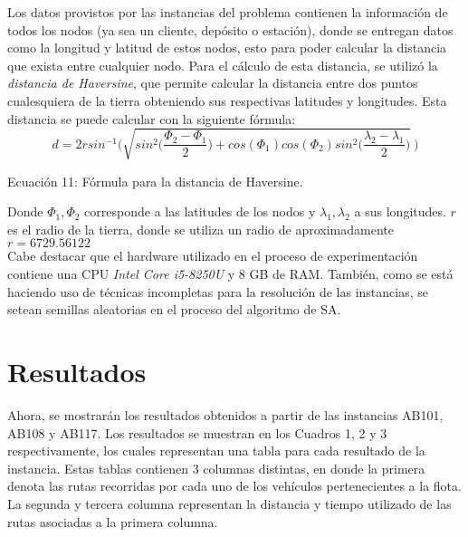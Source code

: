 \documentclass[letter, 10pt]{article}
\begin{document}
Los datos provistos por las instancias del problema contienen la información de todos los nodos (ya sea un cliente, depósito o estación), donde se entregan datos como la longitud y latitud de estos nodos, esto para poder calcular la distancia que exista entre cualquier nodo. Para el cálculo de esta distancia, se utilizó la \emph{distancia de Haversine}, que permite calcular la distancia entre dos puntos cualesquiera de la tierra obteniendo sus respectivas latitudes y longitudes. Esta distancia se puede calcular con la siguiente fórmula:
\\
\begin{equation}
    d = 2r sin^{-1}\bigg(\sqrt{sin^2\Big(\frac{\Phi_2-\Phi_1}{2}\Big)+cos(\Phi_1)cos(\Phi_2)sin^2\Big(\frac{\lambda_2-\lambda_1}{2}\Big)}\ \bigg)
\end{equation}

\begin{center}
    Ecuación 11: Fórmula para la distancia de Haversine.
\end{center}

Donde $\Phi_1, \Phi_2$ corresponde a las latitudes de los nodos y $\lambda_1, \lambda_2$ a sus longitudes. $r$ es el radio de la tierra, donde se utiliza un radio de aproximadamente $r = 6729.56122$
\\

Cabe destacar que el hardware utilizado en el proceso de experimentación contiene una CPU \emph{Intel Core i5-8250U} y 8 GB de RAM. También, como se está haciendo uso de técnicas incompletas para la resolución de las instancias, se setean semillas aleatorias en el proceso del algoritmo de SA.
\newpage

\section{Resultados}
\label{experimentos}
Ahora, se mostrarán los resultados obtenidos a partir de las instancias AB101, AB108 y AB117. Los resultados se muestran en los Cuadros 1, 2 y 3 respectivamente, los cuales representan una tabla para cada resultado de la instancia. Estas tablas contienen 3 columnas distintas, en donde la primera denota las rutas recorridas por cada uno de los vehículos pertenecientes a la flota. La segunda y tercera columna representan la distancia y tiempo utilizado de las rutas asociadas a la  primera columna.
\end{document}
